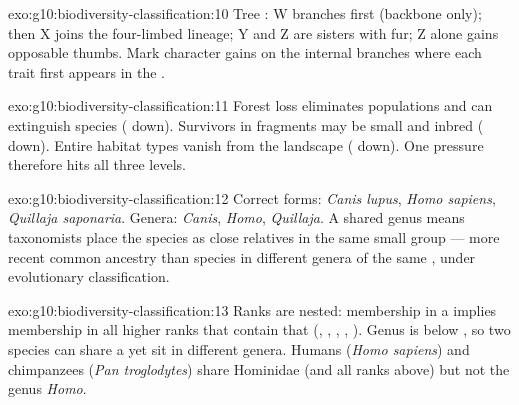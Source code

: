 \begin{solution}{exo:g10:biodiversity-classification:10}
Tree : W branches first (backbone only); then X joins the four-limbed
lineage; Y and Z are sisters with fur; Z alone gains opposable thumbs. Mark
character gains on the internal branches where each trait first appears in the
.
\end{solution}

\begin{solution}{exo:g10:biodiversity-classification:11}
Forest loss eliminates populations and can extinguish species ( down). Survivors in fragments may be small and inbred ( down). Entire habitat types vanish from the landscape ( down). One pressure therefore hits all three levels.
\end{solution}

\begin{solution}{exo:g10:biodiversity-classification:12}
Correct forms: \emph{Canis lupus}, \emph{Homo sapiens}, \emph{Quillaja
saponaria}. Genera: \emph{Canis}, \emph{Homo}, \emph{Quillaja}. A shared genus
means taxonomists place the species as close relatives in the same small
group --- more recent common ancestry than species in different genera of the
same , under evolutionary classification.
\end{solution}

\begin{solution}{exo:g10:biodiversity-classification:13}
Ranks are nested: membership in a  implies membership in all higher
ranks that contain that  (, , , , ). Genus
is below , so two species can share a  yet sit in different genera.
Humans (\emph{Homo sapiens}) and chimpanzees (\emph{Pan troglodytes}) share
 Hominidae (and all ranks above) but not the genus \emph{Homo}.
\end{solution}

